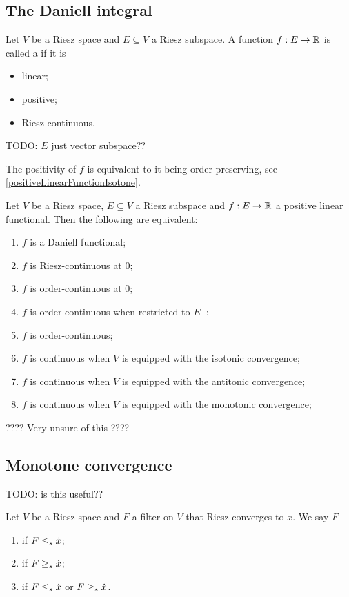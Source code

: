 \subsection{The Daniell integral}
\begin{definition}
Let $V$ be a Riesz space and $E\subseteq V$ a Riesz subspace. A function $f: E\to \mathbb{R}$ is called a  if it is
\begin{itemize}
\item linear;
\item positive;
\item Riesz-continuous.
\end{itemize}
\end{definition}
TODO: $E$ just vector subspace??

The positivity of $f$ is equivalent to it being order-preserving, see \ref{positiveLinearFunctionIsotone}.

\begin{lemma}
Let $V$ be a Riesz space, $E\subseteq V$ a Riesz subspace and $f: E\to \mathbb{R}$ a positive linear functional. Then the following are equivalent:
\begin{enumerate}
\item $f$ is a Daniell functional;
\item $f$ is Riesz-continuous at $0$;
\item $f$ is order-continuous at $0$;
\item $f$ is order-continuous when restricted to $E^+$;
\item $f$ is order-continuous;
\item $f$ is continuous when $V$ is equipped with the isotonic convergence;
\item $f$ is continuous when $V$ is equipped with the antitonic convergence;
\item $f$ is continuous when $V$ is equipped with the monotonic convergence;
\end{enumerate}
\end{lemma}
???? Very unsure of this ????

\subsection{Monotone convergence}
TODO: is this useful??

\begin{definition}
Let $V$ be a Riesz space and $F$ a filter on $V$ that Riesz-converges to $x$. We say $F$
\begin{enumerate}
\item {} if $F \leq_s\dot{x}$;
\item {} if $F \geq_s\dot{x}$;
\item {} if $F \leq_s\dot{x}$ or $F \geq_s\dot{x}$.
\end{enumerate}
\end{definition}

